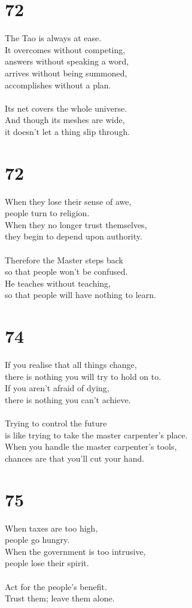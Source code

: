 \documentclass[b5paper, 12pt, oneside]{book}
\begin{document}
\chapter*{72}
The Tao is always at ease.\\
It overcomes without competing,\\
answers without speaking a word,\\
arrives without being summoned,\\
accomplishes without a plan.\\
\\
Its net covers the whole universe.\\
And though its meshes are wide,\\
it doesn't let a thing slip through.

\chapter*{72}
When they lose their sense of awe,\\
people turn to religion.\\
When they no longer trust themselves,\\
they begin to depend upon authority.\\
\\
Therefore the Master steps back\\
so that people won't be confused.\\
He teaches without teaching,\\
so that people will have nothing to learn.

\chapter*{74}
If you realise that all things change,\\
there is nothing you will try to hold on to.\\
If you aren't afraid of dying,\\
there is nothing you can't achieve.\\
\\
Trying to control the future\\
is like trying to take the master carpenter's place.\\
When you handle the master carpenter's tools,\\
chances are that you'll cut your hand.

\chapter*{75}
When taxes are too high,\\
people go hungry.\\
When the government is too intrusive,\\
people lose their spirit.\\
\\
Act for the people's benefit.\\
Trust them; leave them alone.
\end{document}
